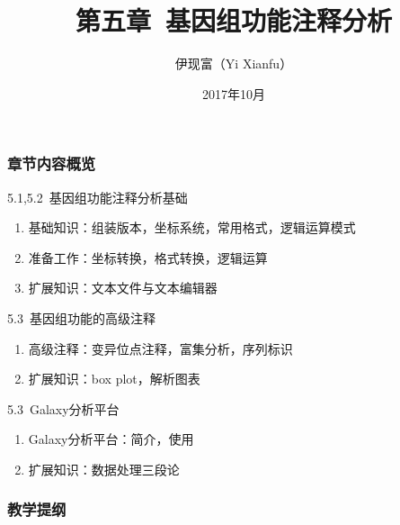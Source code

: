 




\title[基因组功能注释分析]{第五章\ 基因组功能注释分析}
\author[Yixf]{伊现富（Yi Xianfu）}
\date{2017年10月}

\begin{frame}
  \titlepage
\end{frame}

\begin{frame}
  \frametitle{章节内容概览}
  \begin{block}{5.1,5.2\ 基因组功能注释分析基础}
    \begin{enumerate}
      \item 基础知识：组装版本，坐标系统，常用格式，逻辑运算模式
      \item 准备工作：坐标转换，格式转换，逻辑运算
      \item 扩展知识：文本文件与文本编辑器
    \end{enumerate}
  \end{block}
  \begin{block}{5.3\ 基因组功能的高级注释}
    \begin{enumerate}
      \item 高级注释：变异位点注释，富集分析，序列标识
      \item 扩展知识：box plot，解析图表
    \end{enumerate}
  \end{block}
  \begin{block}{5.3\ Galaxy分析平台}
    \begin{enumerate}
      \item Galaxy分析平台：简介，使用
      \item 扩展知识：数据处理三段论
    \end{enumerate}
  \end{block}
\end{frame}

\begin{frame}[plain]
  \frametitle{教学提纲}
  \setcounter{tocdepth}{2}
  \begin{multicols}{2}
  \tableofcontents
  \end{multicols}
\end{frame}








